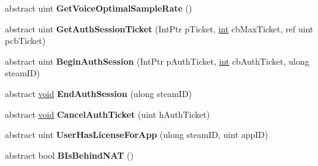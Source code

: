 \begin{DoxyCompactItemize}
\item 
\hypertarget{classValve_1_1Steamworks_1_1ISteamUser_a76dc681a9b91fb29726b302763edfe04}{}abstract uint {\bfseries Get\+Voice\+Optimal\+Sample\+Rate} ()\label{classValve_1_1Steamworks_1_1ISteamUser_a76dc681a9b91fb29726b302763edfe04}

\item 
\hypertarget{classValve_1_1Steamworks_1_1ISteamUser_a3e56f6ab9c27dd10b6f79b04f63fe0ad}{}abstract uint {\bfseries Get\+Auth\+Session\+Ticket} (Int\+Ptr p\+Ticket, \hyperlink{SDL__thread_8h_a6a64f9be4433e4de6e2f2f548cf3c08e}{int} cb\+Max\+Ticket, ref uint pcb\+Ticket)\label{classValve_1_1Steamworks_1_1ISteamUser_a3e56f6ab9c27dd10b6f79b04f63fe0ad}

\item 
\hypertarget{classValve_1_1Steamworks_1_1ISteamUser_a00e59ade00702761d6ad9f7a832c883d}{}abstract uint {\bfseries Begin\+Auth\+Session} (Int\+Ptr p\+Auth\+Ticket, \hyperlink{SDL__thread_8h_a6a64f9be4433e4de6e2f2f548cf3c08e}{int} cb\+Auth\+Ticket, ulong steam\+I\+D)\label{classValve_1_1Steamworks_1_1ISteamUser_a00e59ade00702761d6ad9f7a832c883d}

\item 
\hypertarget{classValve_1_1Steamworks_1_1ISteamUser_a75f85dac08cc323a2c3fe3d1f2f4a92c}{}abstract \hyperlink{SDL__audio_8h_a52835ae37c4bb905b903cbaf5d04b05f}{void} {\bfseries End\+Auth\+Session} (ulong steam\+I\+D)\label{classValve_1_1Steamworks_1_1ISteamUser_a75f85dac08cc323a2c3fe3d1f2f4a92c}

\item 
\hypertarget{classValve_1_1Steamworks_1_1ISteamUser_ac64cf98166f7679bc0e15bb4b1869598}{}abstract \hyperlink{SDL__audio_8h_a52835ae37c4bb905b903cbaf5d04b05f}{void} {\bfseries Cancel\+Auth\+Ticket} (uint h\+Auth\+Ticket)\label{classValve_1_1Steamworks_1_1ISteamUser_ac64cf98166f7679bc0e15bb4b1869598}

\item 
\hypertarget{classValve_1_1Steamworks_1_1ISteamUser_a4985bd96456f31e7f89a0637a2f3a366}{}abstract uint {\bfseries User\+Has\+License\+For\+App} (ulong steam\+I\+D, uint app\+I\+D)\label{classValve_1_1Steamworks_1_1ISteamUser_a4985bd96456f31e7f89a0637a2f3a366}

\item 
\hypertarget{classValve_1_1Steamworks_1_1ISteamUser_ae0b7d38f71c0287b4910f70f1275bd1b}{}abstract bool {\bfseries B\+Is\+Behind\+N\+A\+T} ()\label{classValve_1_1Steamworks_1_1ISteamUser_ae0b7d38f71c0287b4910f70f1275bd1b}


\end{DoxyCompactItemize}
